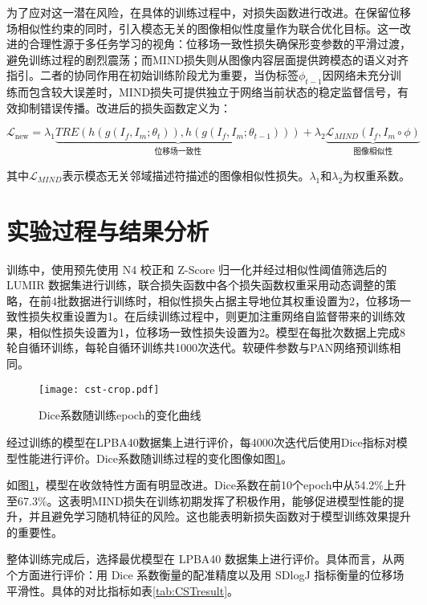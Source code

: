 为了应对这一潜在风险，在具体的训练过程中，对损失函数进行改进。在保留位移场相似性约束的同时，引入模态无关的图像相似性度量作为联合优化目标。这一改进的合理性源于多任务学习的视角：位移场一致性损失确保形变参数的平滑过渡，避免训练过程的剧烈震荡；而MIND损失则从图像内容层面提供跨模态的语义对齐指引。二者的协同作用在初始训练阶段尤为重要，当伪标签$\phi_{t-1}$因网络未充分训练而包含较大误差时，MIND损失可提供独立于网络当前状态的稳定监督信号，有效抑制错误传播。改进后的损失函数定义为：

\begin{equation}
    \mathcal{L}_{\text{new}} = \lambda_1 \underbrace{TRE(h(g(I_f,I_m;\theta_t)),h(g(I_f,I_m;\theta_{t-1})))}_{\text{位移场一致性}} + \lambda_2 \underbrace{\mathcal{L}_{MIND}(I_f,I_m\circ \phi)}_{\text{图像相似性}}
\end{equation}

其中$\mathcal{L}_{MIND}$表示模态无关邻域描述符描述的图像相似性损失。$\lambda_1$和$\lambda_2$为权重系数。



\section{实验过程与结果分析}

训练中，使用预先使用 N4 校正和 Z-Score 归一化并经过相似性阈值筛选后的LUMIR 数据集进行训练，联合损失函数中各个损失函数权重采用动态调整的策略，在前4批数据进行训练时，相似性损失占据主导地位其权重设置为2，位移场一致性损失权重设置为1。在后续训练过程中，则更加注重网络自监督带来的训练效果，相似性损失设置为1，位移场一致性损失设置为2。模型在每批次数据上完成8轮自循环训练，每轮自循环训练共1000次迭代。软硬件参数与PAN网络预训练相同。

\begin{figure}[h]
    \centering
    \texttt{[image: cst-crop.pdf]}
    \caption{Dice系数随训练epoch的变化曲线}
    \label{fig:cstloss}
\end{figure}

经过训练的模型在LPBA40数据集上进行评价，每4000次迭代后使用Dice指标对模型性能进行评价。Dice系数随训练过程的变化图像如图\ref{fig:cstloss}。


如图\ref{fig:cstloss}，模型在收敛特性方面有明显改进。Dice系数在前10个epoch中从54.2\%上升至67.3\%。这表明MIND损失在训练初期发挥了积极作用，能够促进模型性能的提升，并且避免学习随机特征的风险。这也能表明新损失函数对于模型训练效果提升的重要性。

整体训练完成后，选择最优模型在 LPBA40 数据集上进行评价。具体而言，从两个方面进行评价：用 Dice 系数衡量的配准精度以及用 SDlogJ 指标衡量的位移场平滑性。具体的对比指标如表\ref{tab:CSTresult}。

